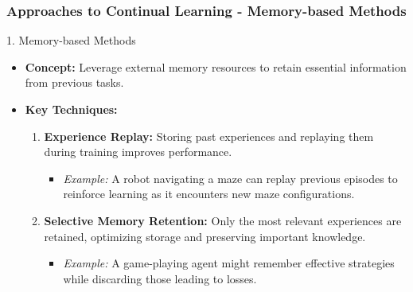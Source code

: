 \documentclass[aspectratio=169]{beamer}
\begin{document}
\begin{frame}[fragile]
    \frametitle{Approaches to Continual Learning - Memory-based Methods}
    \begin{block}{1. Memory-based Methods}
        \begin{itemize}
            \item \textbf{Concept:} Leverage external memory resources to retain essential information from previous tasks.
            \item \textbf{Key Techniques:}
                \begin{enumerate}
                    \item \textbf{Experience Replay:} Storing past experiences and replaying them during training improves performance.
                          \begin{itemize}
                              \item \textit{Example:} A robot navigating a maze can replay previous episodes to reinforce learning as it encounters new maze configurations.
                          \end{itemize}
                    \item \textbf{Selective Memory Retention:} Only the most relevant experiences are retained, optimizing storage and preserving important knowledge.
                          \begin{itemize}
                              \item \textit{Example:} A game-playing agent might remember effective strategies while discarding those leading to losses.
                          \end{itemize}
                \end{enumerate}
        \end{itemize}
    \end{block}
\end{frame}
\end{document}
